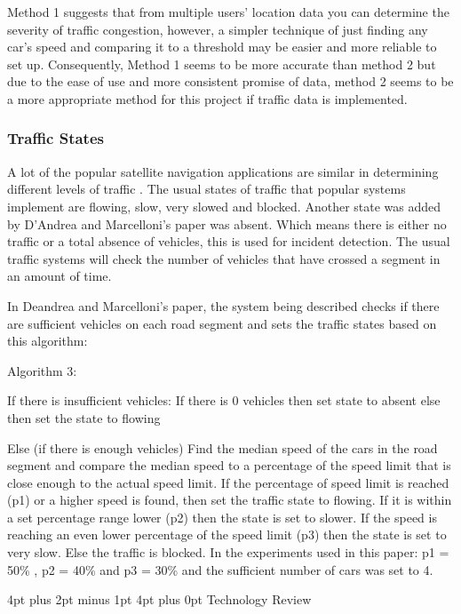 \documentclass[12pt,a4paper]{article}
\makeatletter
\renewcommand\section{\@startsection {section}{1}{0mm} %
                               {4pt plus 2pt minus 1pt} %
                               {4pt plus 0pt} %
                               {\Large\bfseries}}
\makeatother
\begin{document}
Method 1 suggests that from multiple users’ location data you can determine the severity of traffic congestion, however, a simpler technique of just finding any car’s speed and comparing it to a threshold may be easier and more reliable to set up. Consequently, Method 1 seems to be more accurate than method 2 but due to the ease of use and more consistent promise of data, method 2 seems to be a more appropriate method for this project if traffic data is implemented.

\subsubsection{Traffic States}

A lot of the popular satellite navigation applications are similar in determining different levels of traffic \cite{DAndrea2017}. The usual states of traffic that popular systems implement are flowing, slow, very slowed and blocked. Another state was added by D’Andrea and Marcelloni’s paper was absent. Which means there is either no traffic or a total absence of vehicles, this is used for incident detection. The usual traffic systems will check the number of vehicles that have crossed a segment in an amount of time.

In Deandrea and Marcelloni’s paper, the system being described checks if there are sufficient vehicles on each road segment and sets the traffic states based on this algorithm:

Algorithm 3:

If there is insufficient vehicles:
If there is 0 vehicles then set state to absent
else then set the state to flowing

Else (if there is enough vehicles)
  Find the median speed of the cars in the road segment and compare the median speed to a percentage of the speed limit that is close enough to the actual speed limit.
  If the percentage of speed limit is reached (p1) or a higher speed is found, then set the traffic state to flowing.
  If it is within a set percentage range lower (p2) then the state is set to slower.
  If the speed is reaching an even lower percentage of the speed limit (p3) then the state is set to very slow.
  Else the traffic is blocked.
  In the experiments used in this paper: p1 = 50\% , p2 = 40\% and p3 = 30\% and the sufficient number of cars was set to 4.
 

\section{Technology Review}
\end{document}
